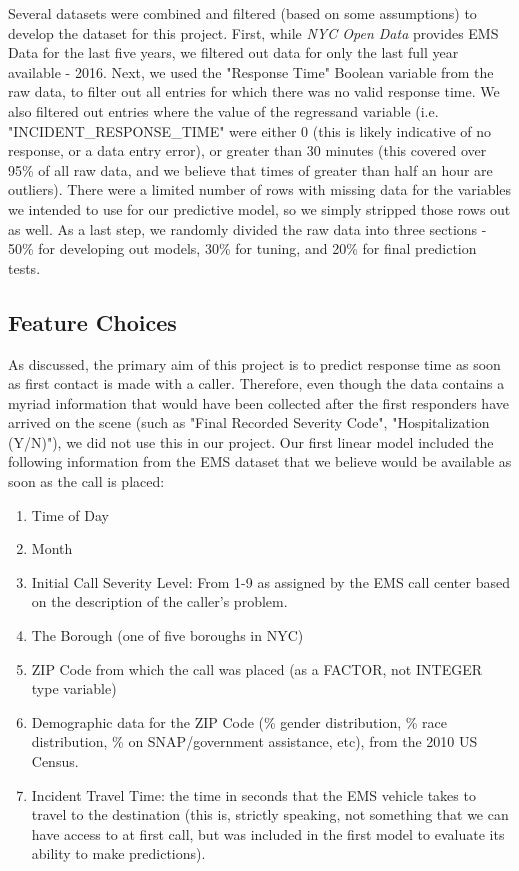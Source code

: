 \documentclass[twoside,11pt]{article}
\begin{document}
Several datasets were combined and filtered (based on some assumptions) to develop the dataset for this project. First, while \emph{NYC Open Data} provides EMS Data for the last five years, we filtered out data for only the last full year available - 2016. Next, we used the "Response Time" Boolean variable from the raw data, to filter out all entries for which there was no valid response time. We also filtered out entries where the value of the regressand variable (i.e. "INCIDENT\_RESPONSE\_TIME"  were  either 0 (this is likely indicative of no response, or a data entry error), or greater than 30 minutes (this covered over 95\% of all raw data, and we believe that times of greater than half an hour are outliers). There were a limited number of rows with missing data for the variables we intended to use for our predictive model, so we simply stripped those rows out as well. As a last step, we randomly divided the raw data into three sections - 50\% for developing out models, 30\%  for tuning, and 20\% for final prediction tests.

\subsection{Feature Choices}

As discussed, the primary aim of this project is to predict response time as soon as first contact is made with a caller. Therefore, even though the data contains a myriad information  that would have been collected after the first responders have arrived on the scene (such as "Final Recorded Severity Code", "Hospitalization (Y/N)"), we did not use this in our project. Our first linear model included the following information from the EMS dataset that we believe would be available as soon as the call is placed:
\begin{enumerate}
    \item Time of Day
    \item Month
    \item Initial Call Severity Level: From 1-9 as assigned by the EMS call center based on the description of the caller's problem.
    \item The Borough (one of five boroughs in NYC)
    \item ZIP Code from which the call was placed (as a FACTOR, not INTEGER type variable)
    \item Demographic data for the ZIP Code (\% gender distribution, \% race  distribution, \% on SNAP/government assistance, etc), from the 2010 US Census.
    \item Incident Travel Time: the time in seconds that the EMS vehicle takes to travel to the destination (this is, strictly speaking, not something that we can have access to at first call, but was included in the first model to evaluate its ability to make predictions).
\end{enumerate}
\end{document}
